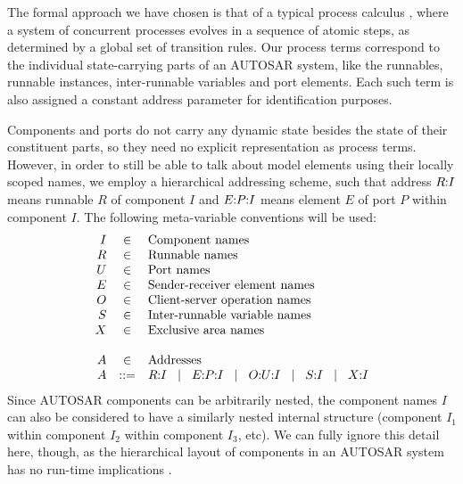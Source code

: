 \documentclass[twocolumn]{article}
\newcommand{\seq}[2]{#1\hspace{-0.7ex}:\hspace{-0.7ex}#2}
\newcommand{\seqq}[3]{#1\hspace{-0.7ex}:\hspace{-0.7ex}#2\hspace{-0.7ex}:\hspace{-0.7ex}#3}
\newcommand{\sep}{\hspace{2ex}|\hspace{2ex}}
\begin{document}
The formal approach we have chosen is that of a typical process calculus \cite{}, where a system of concurrent processes evolves in a sequence of atomic steps, as determined by a global set of transition rules. Our process terms correspond to the individual state-carrying parts of an AUTOSAR system, like the runnables, runnable instances, inter-runnable variables and port elements. Each such term is also assigned a constant address parameter for identification purposes.

Components and ports do not carry any dynamic state besides the state of their constituent parts, so they need no explicit representation as process terms. However, in order to still be able to talk about model elements using their locally scoped names, we employ a hierarchical addressing scheme, such that address $\seq{R}{I} $ means runnable $R$ of component $I$ and $\seqq{E}{P}{I}$ means element $E$ of port $P$ within component $I$. The following meta-variable conventions will be used:
$$
\begin{array}{rcll}
	I	& \in		& \mbox{Component names} \\
	R	& \in		& \mbox{Runnable names} \\
	U	& \in		& \mbox{Port names} \\
	E	& \in		& \mbox{Sender-receiver element names} \\
	O	& \in		& \mbox{Client-server operation names} \\
	S	& \in		& \mbox{Inter-runnable variable names} \\
	X	& \in		& \mbox{Exclusive area names} \\
	\\
	A	& \in		& \mbox{Addresses} \\
	A	& ::=		& \seq{R}{I}   \sep   \seqq{E}{P}{I}   \sep   \seqq{O}{U}{I}   \sep   \seq{S}{I}   \sep   \seq{X}{I}   \\
\end{array}
$$
Since AUTOSAR components can be arbitrarily nested, the component names $I$ can also be considered to have a similarly nested internal structure (component $I_1$ within component $I_2$ within component $I_3$, etc). We can fully ignore this detail here, though, as the hierarchical layout of components in an AUTOSAR system has no run-time implications \cite{}.
\end{document}
